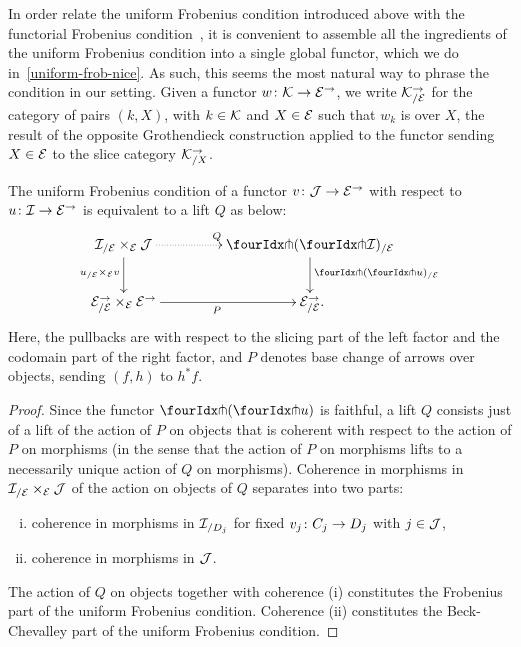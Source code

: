 \documentclass[reqno,10pt,a4paper,oneside,draft]{amsart}
\begin{document}
In order relate the uniform Frobenius condition introduced above with the functorial Frobenius condition~\cite{garner:topological-simplicial}, it is convenient 
to assemble all the ingredients of the uniform Frobenius condition into a single global functor, which we do in~\cref{uniform-frob-nice}.
As such, this seems the most natural way to phrase the condition in our setting.
Given a functor $w \co \cal{K} \to \cal{E}^\to$, we write $\cal{K}_{/\cal{E}}^{\to}$ for the category of 
pairs $(k, X)$, with $k \in \cal{K}$ and $X \in \cal{E}$ such that $w_k$ is over $X$, \ie the result of
the opposite Grothendieck construction applied to the functor sending $X \in \cal{E}$ to the slice category $\cal{K}_{/X}^{\to}$.

\begin{proposition}
\label{uniform-frob-nice}
The uniform Frobenius condition of a functor $v \co \cal{J} \to \cal{E}^\to$ with respect to $u \co \cal{I} \to \cal{E}^\to$ is equivalent to a lift $Q$ as below:
\begin{equation} \label{uniform-frob-nice:lift}
\begin{gathered}
\xymatrix@C+2em{
  \cal{I}_{/\cal{E}} \times_{\cal{E}} \cal{J}
  \ar@{.>}[r]^{Q}
  \ar[d]_{u_{/\cal{E}} \times_{\cal{E}} v}
&
  \liftl{(\liftr{\cal{I}})}_{/\cal{E}}
  \ar[d]^{\liftl{(\liftr{u})}_{/\cal{E}}}
\\
  \cal{E}^\to_{/\cal{E}} \times_{\cal{E}} \cal{E}^\to
  \ar[r]_{P}
&
  \cal{E}_{/\cal{E}}^\to
\rlap{.}}
\end{gathered}
\end{equation}
Here, the pullbacks are with respect to the slicing part of the left factor and the codomain part of the right factor, and $P$ denotes base change of arrows over objects, sending $(f, h)$ to $h^* f$.
\end{proposition}

\begin{proof}
Since the functor $\liftl{(\liftr{u})}$ is faithful, a lift $Q$ consists just of a lift of the action of $P$ on objects that is coherent with respect to the action of $P$ on morphisms (in the sense that the action of $P$ on morphisms lifts to a necessarily unique action of $Q$ on morphisms).
Coherence in morphisms in $\cal{I}_{/\cal{E}} \times_{\cal{E}} \cal{J}$ of the action on objects of $Q$ separates into two parts:
\begin{enumerate}[(i)]
\item coherence in morphisms in $\cal{I}_{/D_j}$ for fixed $v_j \co C_j \to D_j$ with $j \in \cal{J}$,
\item coherence in morphisms in $\cal{J}$.
\end{enumerate}
The action of $Q$ on objects together with coherence (i) constitutes the Frobenius part of the uniform Frobenius condition.
Coherence (ii) constitutes the Beck-Chevalley part of the uniform Frobenius condition.
\end{proof}
\end{document}
